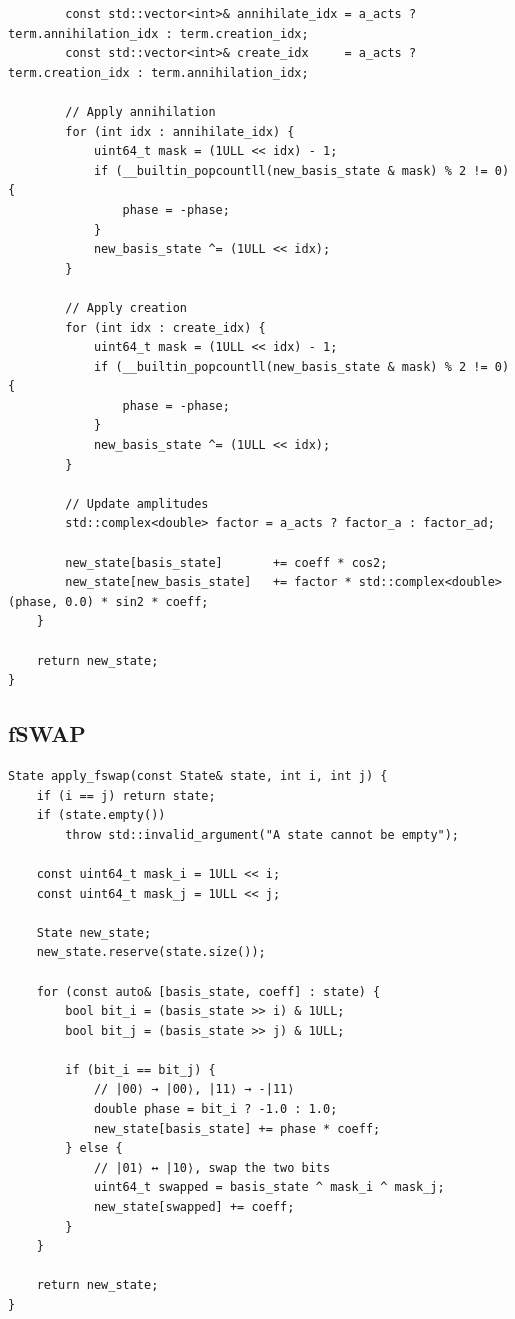 \begin{verbatim}
        const std::vector<int>& annihilate_idx = a_acts ? term.annihilation_idx : term.creation_idx;
        const std::vector<int>& create_idx     = a_acts ? term.creation_idx : term.annihilation_idx;

        // Apply annihilation
        for (int idx : annihilate_idx) {
            uint64_t mask = (1ULL << idx) - 1;
            if (__builtin_popcountll(new_basis_state & mask) % 2 != 0) {
                phase = -phase;
            }
            new_basis_state ^= (1ULL << idx);
        }

        // Apply creation
        for (int idx : create_idx) {
            uint64_t mask = (1ULL << idx) - 1;
            if (__builtin_popcountll(new_basis_state & mask) % 2 != 0) {
                phase = -phase;
            }
            new_basis_state ^= (1ULL << idx);
        }

        // Update amplitudes
        std::complex<double> factor = a_acts ? factor_a : factor_ad;

        new_state[basis_state]       += coeff * cos2;
        new_state[new_basis_state]   += factor * std::complex<double>(phase, 0.0) * sin2 * coeff;
    }

    return new_state;
}
\end{verbatim}

\subsection{fSWAP}\label{subsec:appendix-fswap}
\begin{verbatim}
State apply_fswap(const State& state, int i, int j) {
    if (i == j) return state;
    if (state.empty())
        throw std::invalid_argument("A state cannot be empty");

    const uint64_t mask_i = 1ULL << i;
    const uint64_t mask_j = 1ULL << j;

    State new_state;
    new_state.reserve(state.size());

    for (const auto& [basis_state, coeff] : state) {
        bool bit_i = (basis_state >> i) & 1ULL;
        bool bit_j = (basis_state >> j) & 1ULL;

        if (bit_i == bit_j) {
            // |00⟩ → |00⟩, |11⟩ → -|11⟩
            double phase = bit_i ? -1.0 : 1.0;
            new_state[basis_state] += phase * coeff;
        } else {
            // |01⟩ ↔ |10⟩, swap the two bits
            uint64_t swapped = basis_state ^ mask_i ^ mask_j;
            new_state[swapped] += coeff;
        }
    }

    return new_state;
}
\end{verbatim}

